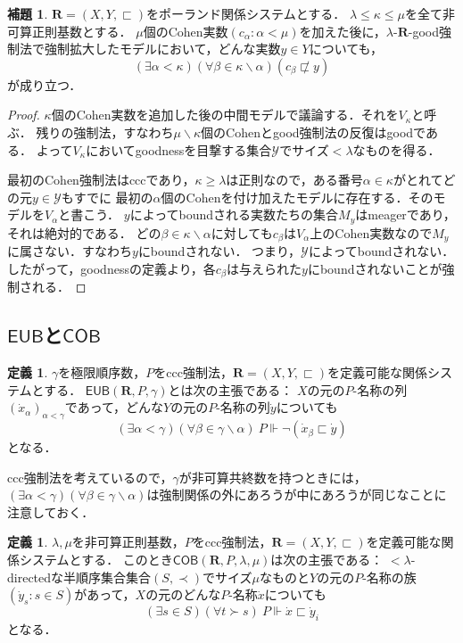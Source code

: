 \documentclass[uplatex,dvipdfmx]{jsarticle}
\newcommand\forces{\Vdash}
\newcommand{\EUB}{\mathsf{EUB}}
\newcommand{\COB}{\mathsf{COB}}
\newcommand{\relR}{\mathbf{R}}
\renewcommand{\setminus}{\smallsetminus}
\theoremstyle{definition}
\newtheorem{defi}[thm]{定義}
\newtheorem{lem}[thm]{補題}
\begin{document}
	\begin{lem}
		$\relR = (X, Y, \sqsubset)$をポーランド関係システムとする．
		$\lambda \le \kappa \le \mu$を全て非可算正則基数とする．
		$\mu$個のCohen実数$(c_\alpha : \alpha < \mu)$を加えた後に，$\lambda$-$\relR$-good強制法で強制拡大したモデルにおいて，どんな実数$y \in Y$についても，
		\[
		(\exists \alpha < \kappa)(\forall \beta \in \kappa \setminus \alpha)(c_\beta \not \sqsubset y)
		\]
		が成り立つ．
	\end{lem}
	\begin{proof}
		$\kappa$個のCohen実数を追加した後の中間モデルで議論する．それを$V_\kappa$と呼ぶ．
		残りの強制法，すなわち$\mu\setminus\kappa$個のCohenとgood強制法の反復はgoodである．
		よって$V_\kappa$においてgoodnessを目撃する集合$\mathcal{Y}$でサイズ${<}\lambda$なものを得る． 

		最初のCohen強制法はcccであり，$\kappa\ge \lambda$は正則なので，ある番号$\alpha\in\kappa$がとれてどの元$y \in \mathcal{Y}$もすでに
		最初の$\alpha$個のCohenを付け加えたモデルに存在する．そのモデルを$V_{\alpha}$と書こう．
		$y$によってboundされる実数たちの集合$M_y$はmeagerであり，それは絶対的である．
		どの$\beta\in\kappa\setminus \alpha$に対しても$c_\beta$は$V_{\alpha}$上のCohen実数なので$M_y$に属さない．すなわち$y$にboundされない．
		つまり，$\mathcal Y$によってboundされない．
		したがって，goodnessの定義より，各$c_\beta$は与えられた$y$にboundされないことが強制される．
	\end{proof}
	
	\subsection{$\EUB$と$\COB$}
	
	\begin{defi}
		$\gamma$を極限順序数，$P$をccc強制法，$\relR = (X, Y, \sqsubset)$を定義可能な関係システムとする．
		$\EUB(\relR, P, \gamma)$とは次の主張である：
		$X$の元の$P$-名称の列$(\dot{x}_\alpha)_{\alpha < \gamma}$であって，どんな$Y$の元の$P$-名称の列$\dot{y}$についても
		\[
		(\exists \alpha < \gamma)(\forall \beta \in \gamma \setminus \alpha)\ P \forces \neg (\dot{x}_\beta \sqsubset \dot{y})
		\]
		となる．
	\end{defi}
	ccc強制法を考えているので，$\gamma$が非可算共終数を持つときには，$(\exists \alpha < \gamma)(\forall \beta \in \gamma \setminus \alpha)$は強制関係の外にあろうが中にあろうが同じなことに注意しておく．
	
	\begin{defi}
		$\lambda, \mu$を非可算正則基数，$P$をccc強制法，$\relR = (X, Y, \sqsubset)$を定義可能な関係システムとする．
		このとき$\COB(\relR, P, \lambda, \mu)$は次の主張である：
		${<}\lambda$-directedな半順序集合集合$(S, \prec)$でサイズ$\mu$なものと$Y$の元の$P$-名称の族$(\dot{y}_s : s \in S)$があって，$X$の元のどんな$P$-名称$\dot{x}$についても
		\[
		(\exists s \in S)(\forall t \succ s) \ P \forces \dot{x} \sqsubset \dot{y}_i
		\]
		となる．
	\end{defi}
\end{document}
